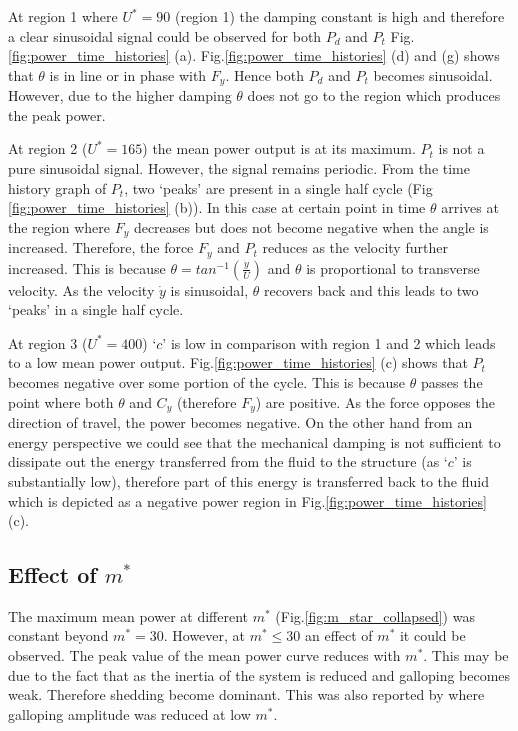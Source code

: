  At region 1 where $U^*=90$ (region 1) the damping constant is high and therefore a clear sinusoidal signal could be observed for both $P_d$ and $P_t$ Fig. \ref{fig:power_time_histories} (a). Fig.\ref{fig:power_time_histories} (d) and (g) shows that $\theta$ is in line or in phase with $F_y$. Hence both $P_d$ and $P_t$ becomes sinusoidal. However, due to the higher damping  $\theta$ does not go to the region which produces the peak power. 

At region 2 ($U^*=165$) the mean power output is at its maximum. $P_t$ is not a pure sinusoidal signal. However, the  signal remains periodic. From the time history graph of $P_t$, two `peaks' are present in a single half cycle (Fig \ref{fig:power_time_histories} (b)). In this case at certain point in time $\theta$ arrives at the region where $F_y$ decreases but does not become negative when the angle is increased. Therefore, the force $F_y$ and $P_t$ reduces as the velocity further increased. This is because $\theta = tan^{-1}(\frac{\dot{y}}{U})$ and $\theta$ is proportional to  transverse velocity. As the velocity $\dot{y}$ is sinusoidal, $\theta$ recovers back and this leads to two `peaks'  in a single half cycle.

 At region 3 ($U^*= 400$) `$c$' is low in comparison with region 1 and 2 which leads to a low mean power output. Fig.\ref{fig:power_time_histories} (c) shows that $P_t$ becomes negative over some portion of the cycle. This is because $\theta$  passes the point where both $\theta$ and $C_y$ (therefore $F_y$) are positive. As the force opposes the direction of travel, the power becomes negative. On the other hand from an energy perspective we could see that the mechanical damping is not sufficient to dissipate out the energy transferred from the fluid to the structure (as `$c$' is substantially low), therefore  part of this energy is transferred back to the fluid which is depicted as a negative power region in Fig.\ref{fig:power_time_histories} (c).

 
  

 



\subsection{Effect of $m^*$}

 

The maximum mean power at different $m^*$ (Fig.\ref{fig:m_star_collapsed}) was constant beyond $m^*=30$. However, at $m^* \leq 30$ an effect of $m^*$ it could be observed. The peak value of the mean power curve reduces with $m^*$. This may be due to the fact that as the inertia of the system is reduced and galloping becomes weak. Therefore shedding become dominant. This was also reported by \cite{Joly2012} where galloping amplitude was reduced at low $m^*$. 

